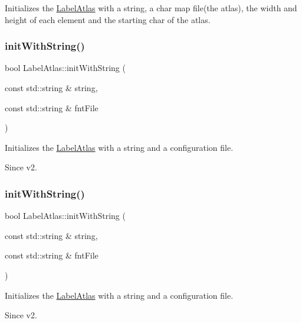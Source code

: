 Initializes the \hyperlink{classLabelAtlas}{Label\+Atlas} with a string, a char map file(the atlas), the width and height of each element and the starting char of the atlas. \mbox{\label{classLabelAtlas_aa1c8b622cf511fec93dbc4c460f14d8d}} 
\subsubsection{\texorpdfstring{init\+With\+String()}{initWithString()}\hspace{0.1cm}{\footnotesize\ttfamily [3/6]}}
{\footnotesize\ttfamily bool Label\+Atlas\+::init\+With\+String (\begin{DoxyParamCaption}\item[{const std\+::string \&}]{string,  }\item[{const std\+::string \&}]{fnt\+File }\end{DoxyParamCaption})}

Initializes the \hyperlink{classLabelAtlas}{Label\+Atlas} with a string and a configuration file. \begin{DoxySince}{Since}
v2. 
\end{DoxySince}
\mbox{\label{classLabelAtlas_aa1c8b622cf511fec93dbc4c460f14d8d}} 
\subsubsection{\texorpdfstring{init\+With\+String()}{initWithString()}\hspace{0.1cm}{\footnotesize\ttfamily [4/6]}}
{\footnotesize\ttfamily bool Label\+Atlas\+::init\+With\+String (\begin{DoxyParamCaption}\item[{const std\+::string \&}]{string,  }\item[{const std\+::string \&}]{fnt\+File }\end{DoxyParamCaption})}

Initializes the \hyperlink{classLabelAtlas}{Label\+Atlas} with a string and a configuration file. \begin{DoxySince}{Since}
v2. 
\end{DoxySince}
\mbox{\label{classLabelAtlas_a48d27c81829144f2e2e6644e56e065be}} 
